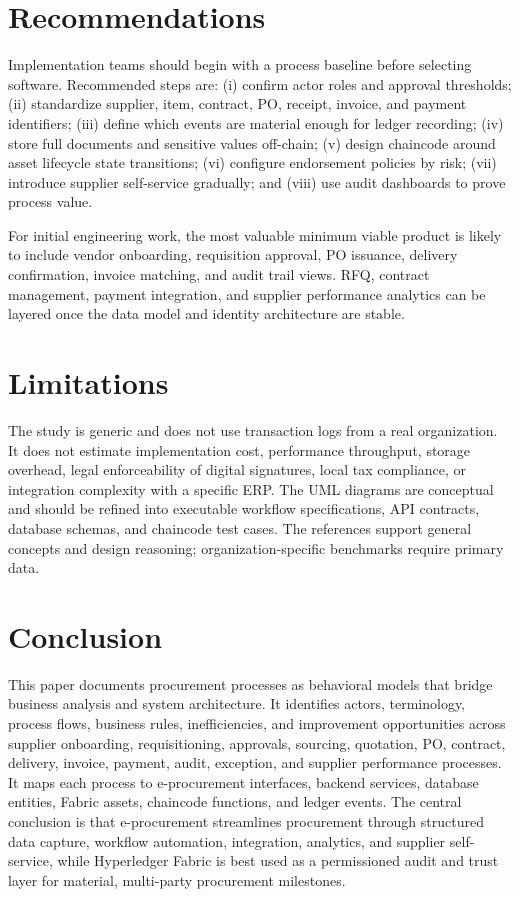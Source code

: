 \documentclass[conference]{IEEEtran}
\begin{document}
\section{Recommendations}
Implementation teams should begin with a process baseline before selecting software. Recommended steps are: (i) confirm actor roles and approval thresholds; (ii) standardize supplier, item, contract, PO, receipt, invoice, and payment identifiers; (iii) define which events are material enough for ledger recording; (iv) store full documents and sensitive values off-chain; (v) design chaincode around asset lifecycle state transitions; (vi) configure endorsement policies by risk; (vii) introduce supplier self-service gradually; and (viii) use audit dashboards to prove process value.

For initial engineering work, the most valuable minimum viable product is likely to include vendor onboarding, requisition approval, PO issuance, delivery confirmation, invoice matching, and audit trail views. RFQ, contract management, payment integration, and supplier performance analytics can be layered once the data model and identity architecture are stable.

\section{Limitations}
The study is generic and does not use transaction logs from a real organization. It does not estimate implementation cost, performance throughput, storage overhead, legal enforceability of digital signatures, local tax compliance, or integration complexity with a specific ERP. The UML diagrams are conceptual and should be refined into executable workflow specifications, API contracts, database schemas, and chaincode test cases. The references support general concepts and design reasoning; organization-specific benchmarks require primary data.

\section{Conclusion}
This paper documents procurement processes as behavioral models that bridge business analysis and system architecture. It identifies actors, terminology, process flows, business rules, inefficiencies, and improvement opportunities across supplier onboarding, requisitioning, approvals, sourcing, quotation, PO, contract, delivery, invoice, payment, audit, exception, and supplier performance processes. It maps each process to e-procurement interfaces, backend services, database entities, Fabric assets, chaincode functions, and ledger events. The central conclusion is that e-procurement streamlines procurement through structured data capture, workflow automation, integration, analytics, and supplier self-service, while Hyperledger Fabric is best used as a permissioned audit and trust layer for material, multi-party procurement milestones.
\end{document}
